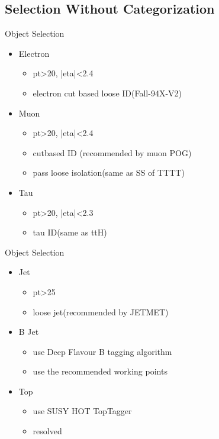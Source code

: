 \documentclass{beamer}
\begin{document}
\subsection{Selection Without Categorization}
\begin{frame}{Object Selection}
  \begin{itemize}
  \item
    Electron 
    \begin{itemize}
    \item
        pt>20, |eta|<2.4
    \item
        electron cut based loose ID(Fall-94X-V2)
    \end{itemize}
  \item
    Muon
    \begin{itemize}
    \item
        pt>20, |eta|<2.4
    \item
        cutbased ID (recommended by muon POG)
    \item
        pass loose isolation(same as SS of TTTT)
    \end{itemize}
  \item
    Tau
    \begin{itemize}
    \item
        pt>20, |eta|<2.3
    \item
        tau ID(same as ttH)
    \end{itemize}
  \end{itemize}
\end{frame}


\begin{frame}{Object Selection}
  \begin{itemize}
  \item
    Jet
    \begin{itemize}
    \item
        pt>25
    \item
        loose jet(recommended by JETMET)
    \end{itemize}
  \item
     B Jet
     \begin{itemize}
        \item
            use Deep Flavour B tagging algorithm 
        \item 
            use the recommended working points
     \end{itemize}
  \item
      Top 
    \begin{itemize}
    \item
        use SUSY HOT TopTagger 
    \item 
        resolved
    \end{itemize}

  \end{itemize}
\end{frame}
\end{document}
